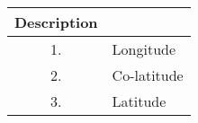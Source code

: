 \begin{tabular}[12pt]{ |c|l| }
  \hline
  \textbf{Description} & \\ \hline
  1. & Longitude \\ \hline
  2. & Co-latitude \\ \hline
  3. & Latitude \\ \hline
\end{tabular}
